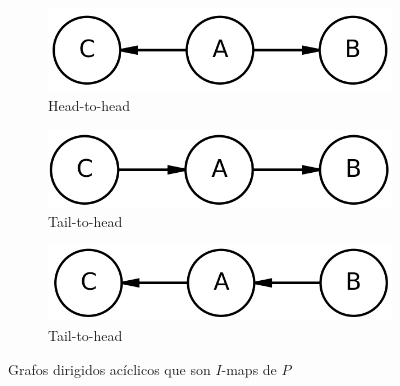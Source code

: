 \documentclass[12pt,a4paper]{article}
\begin{document}
\begin{enumerate}
    \begin{figure}[h!]
        \centering
        \begin{subfigure}{0.3\textwidth}
            \includegraphics[width=\textwidth]{graph331.png}
            \caption{Head-to-head}
            \label{fig:graph331}
        \end{subfigure}
        \hfill
        \begin{subfigure}{0.3\textwidth}
            \includegraphics[width=\textwidth]{graph332.png}
            \caption{Tail-to-head}
            \label{fig:graph332}
        \end{subfigure}
        \hfill
        \begin{subfigure}{0.3\textwidth}
            \includegraphics[width=\textwidth]{graph333.png}
            \caption{Tail-to-head}
            \label{fig:graph333}
        \end{subfigure}
        \caption{Grafos dirigidos acíclicos que son $I$-maps de $P$}
    \end{figure}
\end{enumerate}

\newpage
\end{document}
